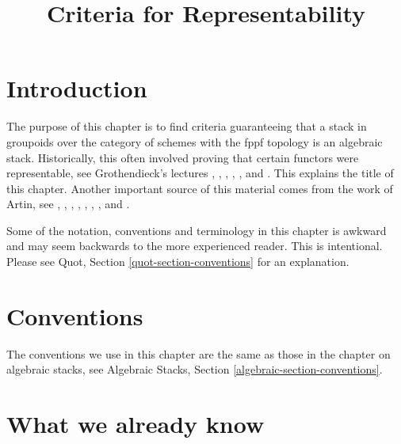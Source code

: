 

%


\title{Criteria for Representability}

\maketitle

\label{section-phantom}

\tableofcontents




\section{Introduction}
\label{section-introduction}

\noindent
The purpose of this chapter is to find criteria guaranteeing that a
stack in groupoids over the category of schemes with the fppf topology
is an algebraic stack. Historically, this often involved proving that
certain functors were representable, see Grothendieck's lectures
\cite{Gr-I},
\cite{Gr-II},
\cite{Gr-III},
\cite{Gr-IV},
\cite{Gr-V}, and
\cite{Gr-VI}.
This explains the title of this chapter. Another important source
of this material comes from the work of Artin, see
\cite{ArtinI},
\cite{ArtinII},
\cite{Artin-Theorem-Representability},
\cite{Artin-Construction-Techniques},
\cite{Artin-Algebraic-Spaces},
\cite{Artin-Algebraic-Approximation},
\cite{Artin-Implicit-Function}, and
\cite{ArtinVersal}.

\medskip\noindent
Some of the notation, conventions and terminology in this chapter is awkward
and may seem backwards to the more experienced reader. This is intentional.
Please see Quot, Section \ref{quot-section-conventions} for an
explanation.



\section{Conventions}
\label{section-conventions}

\noindent
The conventions we use in this chapter are the same as those in the
chapter on algebraic stacks, see
Algebraic Stacks, Section \ref{algebraic-section-conventions}.




\section{What we already know}
\label{section-done-so-far}

